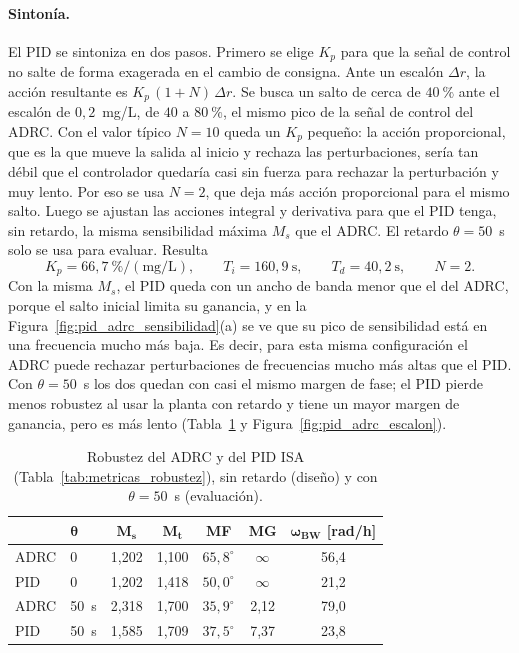 \paragraph{Sintonía.} El PID se sintoniza en dos pasos. Primero se elige $K_p$ para que la señal de
control no salte de forma exagerada en el cambio de consigna. Ante un escalón $\Delta r$, la acción resultante es $K_p\,(1 + N)\,\Delta r$. Se busca un salto de cerca de $40~\%$ ante el
escalón de $0{,}2$~mg/L, de $40$ a $80~\%$, el mismo pico de la señal de control del ADRC. Con el valor
típico $N = 10$ queda un $K_p$ pequeño: la acción proporcional, que es la que mueve la salida al inicio
y rechaza las perturbaciones, sería tan débil que el controlador quedaría casi sin fuerza para rechazar
la perturbación y muy lento. Por eso se usa $N = 2$, que deja más acción proporcional para el mismo
salto. Luego se ajustan las acciones integral y derivativa para que el PID tenga, sin retardo, la misma
sensibilidad máxima $M_s$ que el ADRC. El retardo $\theta = 50$~s solo se usa para evaluar. Resulta
\begin{equation}
K_p = 66{,}7~\%/(\mathrm{mg/L}),
\qquad
T_i = 160{,}9~\mathrm{s},
\qquad
T_d = 40{,}2~\mathrm{s},
\qquad
N = 2 .
\label{eq:pid_ganancias}
\end{equation}
Con la misma $M_s$, el PID queda con un ancho de banda menor que el del ADRC, porque el salto inicial
limita su ganancia, y en la Figura~\ref{fig:pid_adrc_sensibilidad}(a) se ve que su pico de sensibilidad
está en una frecuencia mucho más baja. Es decir, para esta misma configuración el ADRC puede rechazar
perturbaciones de frecuencias mucho más altas que el PID. Con $\theta = 50$~s los dos quedan con casi el
mismo margen de fase; el PID pierde menos robustez al usar la planta con retardo y tiene un mayor margen
de ganancia, pero es más lento (Tabla~\ref{tab:pid_robustez} y Figura~\ref{fig:pid_adrc_escalon}).

\begin{table}[H]
\centering
\caption[Robustez del ADRC y del PID ISA]{Robustez del ADRC y del PID ISA (Tabla~\ref{tab:metricas_robustez}), sin
  retardo (diseño) y con $\theta = 50$~s (evaluación).}
\label{tab:pid_robustez}
\renewcommand{\arraystretch}{1.3}
\begin{tabular}{llccccc}
\toprule
 & $\boldsymbol{\theta}$ & $\boldsymbol{M_s}$ & $\boldsymbol{M_t}$ &
 \textbf{MF} & \textbf{MG} & $\boldsymbol{\omega_{BW}}$ \textbf{[rad/h]} \\
\midrule
ADRC & 0     & 1,202 & 1,100 & $65{,}8^{\circ}$ & $\infty$ & 56,4 \\
PID  & 0     & 1,202 & 1,418 & $50{,}0^{\circ}$ & $\infty$ & 21,2 \\
\midrule
ADRC & 50~s  & 2,318 & 1,700 & $35{,}9^{\circ}$ & 2,12     & 79,0 \\
PID  & 50~s  & 1,585 & 1,709 & $37{,}5^{\circ}$ & 7,37     & 23,8 \\
\bottomrule
\end{tabular}
\end{table}

